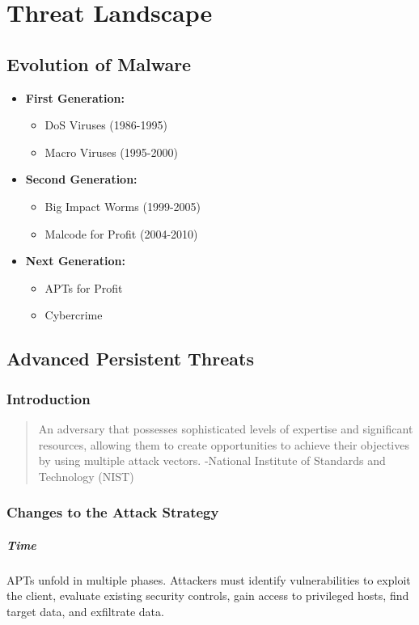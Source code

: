 \section{Threat Landscape}
\subsection{Evolution of Malware}
\begin{itemize}
    \item \textbf{First Generation:}
        \begin{itemize}
            \item DoS Viruses (1986-1995)
            \item Macro Viruses (1995-2000)
        \end{itemize}
    \item \textbf{Second Generation:}
        \begin{itemize}
            \item Big Impact Worms (1999-2005)
            \item Malcode for Profit (2004-2010)
        \end{itemize}
    \item \textbf{Next Generation:}
        \begin{itemize}
            \item APTs for Profit
            \item Cybercrime
        \end{itemize}
\end{itemize}

\subsection{Advanced Persistent Threats}
\subsubsection{Introduction}
\begin{quote}
    An adversary that possesses sophisticated levels of expertise and significant resources, allowing them to create opportunities to achieve their objectives by using multiple attack vectors. 
    -National Institute of Standards and Technology (NIST)
\end{quote}

\subsubsection{Changes to the Attack Strategy}
\subparagraph{Time}
APTs unfold in multiple phases. Attackers must identify vulnerabilities to exploit the client, evaluate existing security controls, gain access to privileged hosts, find target data, and exfiltrate data.

